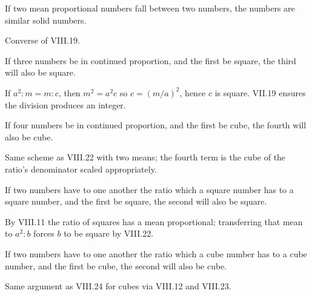 \documentclass{rrxiv}
\begin{document}
\begin{claim}
\label{prop:VIII.21}
If two mean proportional numbers fall between two numbers, the
numbers are similar solid numbers.
\end{claim}
\begin{evidence}
\label{ev:VIII.21}
Converse of VIII.19.
\end{evidence}

\begin{claim}
\label{prop:VIII.22}
If three numbers be in continued proportion, and the first be square,
the third will also be square.
\end{claim}
\begin{evidence}
\label{ev:VIII.22}
If $a^2 : m = m : c$, then $m^2 = a^2 c$ so $c = (m/a)^2$, hence $c$
is square.  VII.19 ensures the division produces an integer.
\end{evidence}

\begin{claim}
\label{prop:VIII.23}
If four numbers be in continued proportion, and the first be cube,
the fourth will also be cube.
\end{claim}
\begin{evidence}
\label{ev:VIII.23}
Same scheme as VIII.22 with two means; the fourth term is the cube
of the ratio's denominator scaled appropriately.
\end{evidence}

\begin{claim}
\label{prop:VIII.24}
If two numbers have to one another the ratio which a square number
has to a square number, and the first be square, the second will
also be square.
\end{claim}
\begin{evidence}
\label{ev:VIII.24}
By VIII.11 the ratio of squares has a mean proportional; transferring
that mean to $a^2 : b$ forces $b$ to be square by VIII.22.
\end{evidence}

\begin{claim}
\label{prop:VIII.25}
If two numbers have to one another the ratio which a cube number has
to a cube number, and the first be cube, the second will also be
cube.
\end{claim}
\begin{evidence}
\label{ev:VIII.25}
Same argument as VIII.24 for cubes via VIII.12 and VIII.23.
\end{evidence}
\end{document}
